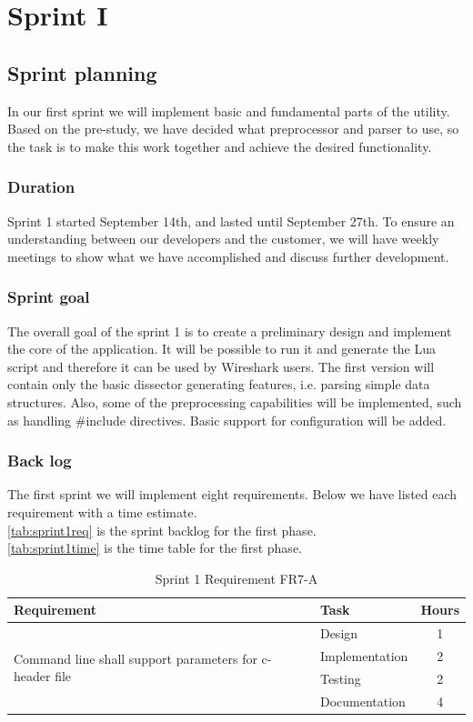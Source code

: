 \chapter{Sprint I}

\section{Sprint planning}
In our first sprint we will implement basic and fundamental parts of the utility. Based on the pre-study, we have decided what preprocessor and parser to use, so the task is to make this work together and achieve the desired functionality.  

\subsection{Duration}
Sprint 1 started September 14th, and lasted until September 27th. To ensure an understanding between our developers and the customer, we will have weekly meetings to show what we have accomplished and discuss further development. 

\subsection{Sprint goal}
The overall goal of the sprint 1 is to create a preliminary design and implement the core of the application. It will be possible to run it and generate the Lua script and therefore it can be used by Wireshark users. The first version will contain only the basic dissector generating features, i.e. parsing simple data structures. Also, some of the preprocessing capabilities will be implemented, such as handling \#include directives. Basic support for configuration will be added.

\subsection{Back log}
The first sprint we will implement eight requirements. Below we have listed each requirement with a time estimate.\\
\autoref{tab:sprint1req} is the sprint backlog for the first phase. \\
\autoref{tab:sprint1time} is the time table for the first phase. \\
\begin{table}[ht] \small \center
\caption{Sprint 1 Requirement FR7-A}
\begin{tabular}{l l c}
	\toprule
	Requirement & Task & Hours \\
	\midrule
	\multirow{4}{5cm}{Command line shall support parameters for c-header file} & Design & 1 \\
	& Implementation & 2 \\
	& Testing & 2 \\
	& Documentation & 4 \\
	\bottomrule
\end{tabular}
\end{table}

